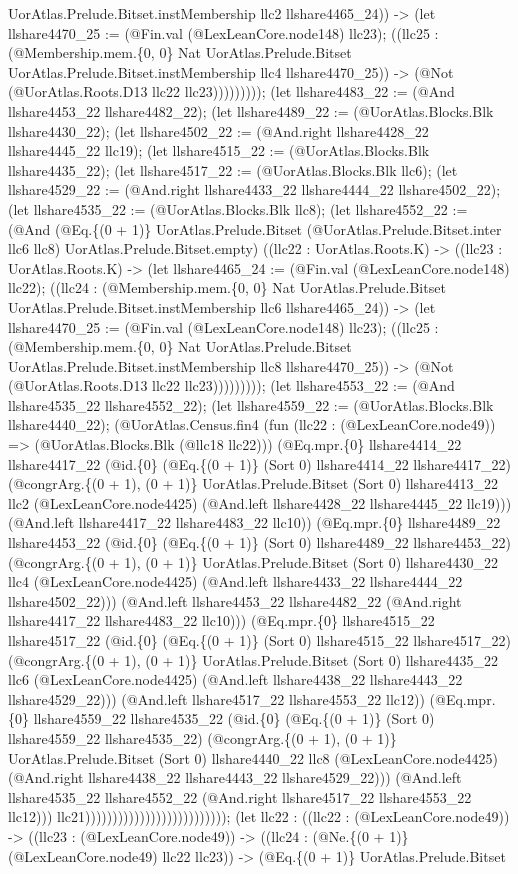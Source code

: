 \documentclass[11pt]{article}
\begin{document}
UorAtlas.Prelude.Bitset.instMembership llc2 llshare4465\_24)) -> (let llshare4470\_25 := (@Fin.val (@LexLeanCore.node148) llc23); ((llc25 : (@Membership.mem.\{0, 0\} Nat UorAtlas.Prelude.Bitset UorAtlas.Prelude.Bitset.instMembership llc4 llshare4470\_25)) -> (@Not (@UorAtlas.Roots.D13 llc22 llc23))))))))); (let llshare4483\_22 := (@And llshare4453\_22 llshare4482\_22); (let llshare4489\_22 := (@UorAtlas.Blocks.Blk llshare4430\_22); (let llshare4502\_22 := (@And.right llshare4428\_22 llshare4445\_22 llc19); (let llshare4515\_22 := (@UorAtlas.Blocks.Blk llshare4435\_22); (let llshare4517\_22 := (@UorAtlas.Blocks.Blk llc6); (let llshare4529\_22 := (@And.right llshare4433\_22 llshare4444\_22 llshare4502\_22); (let llshare4535\_22 := (@UorAtlas.Blocks.Blk llc8); (let llshare4552\_22 := (@And (@Eq.\{(0 + 1)\} UorAtlas.Prelude.Bitset (@UorAtlas.Prelude.Bitset.inter llc6 llc8) UorAtlas.Prelude.Bitset.empty) ((llc22 : UorAtlas.Roots.K) -> ((llc23 : UorAtlas.Roots.K) -> (let llshare4465\_24 := (@Fin.val (@LexLeanCore.node148) llc22); ((llc24 : (@Membership.mem.\{0, 0\} Nat UorAtlas.Prelude.Bitset UorAtlas.Prelude.Bitset.instMembership llc6 llshare4465\_24)) -> (let llshare4470\_25 := (@Fin.val (@LexLeanCore.node148) llc23); ((llc25 : (@Membership.mem.\{0, 0\} Nat UorAtlas.Prelude.Bitset UorAtlas.Prelude.Bitset.instMembership llc8 llshare4470\_25)) -> (@Not (@UorAtlas.Roots.D13 llc22 llc23))))))))); (let llshare4553\_22 := (@And llshare4535\_22 llshare4552\_22); (let llshare4559\_22 := (@UorAtlas.Blocks.Blk llshare4440\_22); (@UorAtlas.Census.fin4 (fun (llc22 : (@LexLeanCore.node49)) => (@UorAtlas.Blocks.Blk (@llc18 llc22))) (@Eq.mpr.\{0\} llshare4414\_22 llshare4417\_22 (@id.\{0\} (@Eq.\{(0 + 1)\} (Sort 0) llshare4414\_22 llshare4417\_22) (@congrArg.\{(0 + 1), (0 + 1)\} UorAtlas.Prelude.Bitset (Sort 0) llshare4413\_22 llc2 (@LexLeanCore.node4425) (@And.left llshare4428\_22 llshare4445\_22 llc19))) (@And.left llshare4417\_22 llshare4483\_22 llc10)) (@Eq.mpr.\{0\} llshare4489\_22 llshare4453\_22 (@id.\{0\} (@Eq.\{(0 + 1)\} (Sort 0) llshare4489\_22 llshare4453\_22) (@congrArg.\{(0 + 1), (0 + 1)\} UorAtlas.Prelude.Bitset (Sort 0) llshare4430\_22 llc4 (@LexLeanCore.node4425) (@And.left llshare4433\_22 llshare4444\_22 llshare4502\_22))) (@And.left llshare4453\_22 llshare4482\_22 (@And.right llshare4417\_22 llshare4483\_22 llc10))) (@Eq.mpr.\{0\} llshare4515\_22 llshare4517\_22 (@id.\{0\} (@Eq.\{(0 + 1)\} (Sort 0) llshare4515\_22 llshare4517\_22) (@congrArg.\{(0 + 1), (0 + 1)\} UorAtlas.Prelude.Bitset (Sort 0) llshare4435\_22 llc6 (@LexLeanCore.node4425) (@And.left llshare4438\_22 llshare4443\_22 llshare4529\_22))) (@And.left llshare4517\_22 llshare4553\_22 llc12)) (@Eq.mpr.\{0\} llshare4559\_22 llshare4535\_22 (@id.\{0\} (@Eq.\{(0 + 1)\} (Sort 0) llshare4559\_22 llshare4535\_22) (@congrArg.\{(0 + 1), (0 + 1)\} UorAtlas.Prelude.Bitset (Sort 0) llshare4440\_22 llc8 (@LexLeanCore.node4425) (@And.right llshare4438\_22 llshare4443\_22 llshare4529\_22))) (@And.left llshare4535\_22 llshare4552\_22 (@And.right llshare4517\_22 llshare4553\_22 llc12))) llc21)))))))))))))))))))))))))); (let llc22 : ((llc22 : (@LexLeanCore.node49)) -> ((llc23 : (@LexLeanCore.node49)) -> ((llc24 : (@Ne.\{(0 + 1)\} (@LexLeanCore.node49) llc22 llc23)) -> (@Eq.\{(0 + 1)\} UorAtlas.Prelude.Bitset 
\end{document}
